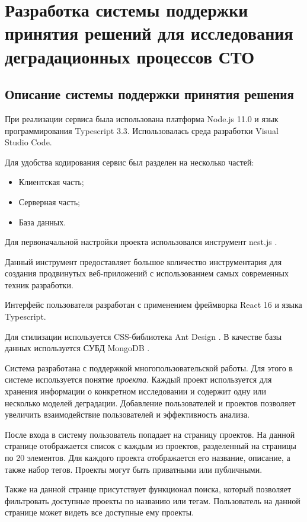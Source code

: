 \section{Разработка системы поддержки принятия решений для исследования деградационных процессов СТО}

\subsection{Описание системы поддержки принятия решения}
При реализации сервиса была использована платформа Node.js 11.0  и язык программирования Typescript 3.3. 
Использовалась среда разработки Visual Studio Code.

Для удобства кодирования сервис был разделен на несколько частей:

\begin{itemize}
    \item Клиентская часть;
    \item Серверная часть;
    \item База данных.
\end{itemize}
Для первоначальной настройки проекта использовался инструмент nest.js \cite{Nest}. 

Данный инструмент предоставляет большое количество инструментария для создания продвинутых веб-приложений с использованием самых современных техник разработки.

Интерфейс пользователя разработан с применением фреймворка React 16 \cite{React} и языка Typescript.

Для стилизации используется CSS-библиотека Ant Design \cite{Antd}.
В качестве базы данных используется СУБД MongoDB \cite{Mongo}.

Система разработана с поддержкой многопользовательской работы. 
Для этого в системе используется понятие \emph{проекта}. 
Каждый проект используется для хранения информации о конкретном исследовании и содержит одну или несколько моделей деградации. 
Добавление пользователей и проектов позволяет увеличить взаимодействие пользователей и эффективность анализа. 

После входа в систему пользователь попадает на страницу проектов.
На данной странице отображается список с каждым из проектов, разделенный на страницы по 20 элементов.
Для каждого проекта отображается его название, описание, а также набор тегов. 
Проекты могут быть приватными или публичными.

Также на данной странце присутствует функционал поиска, который позволяет фильтровать доступные проекты по названию или тегам.
Пользователь на данной странице может видеть все доступные ему проекты.

